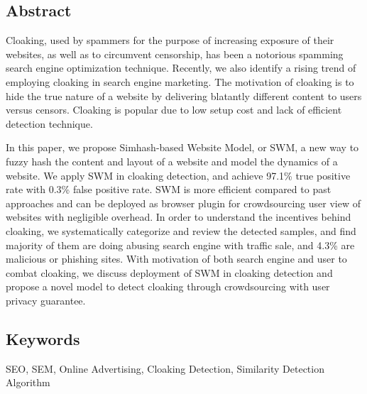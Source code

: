 
\subsection*{Abstract}
Cloaking, used by spammers for the purpose of increasing exposure of
their websites, as well as to circumvent censorship, has been a notorious 
spamming search engine optimization technique. Recently, we also
identify a rising trend of employing cloaking in search engine marketing. The motivation of cloaking 
is to hide the true nature of a website by delivering blatantly different 
content to users versus censors. Cloaking is popular due to low setup cost 
and lack of efficient detection technique. 

In this paper, we propose Simhash-based Website Model, or SWM, a new way to
fuzzy hash the content and layout of a
website and model the dynamics of a website. 
We apply SWM in cloaking detection, and achieve 97.1\% true positive rate with
0.3\% false positive rate. 
SWM is more efficient compared to past approaches and can be deployed as browser
plugin for crowdsourcing user view of websites with negligible overhead.
In order to understand the incentives
behind cloaking, we systematically
categorize and review the detected samples, and find majority of them are
doing abusing search engine with traffic sale, and 4.3\% are 
malicious or phishing sites.
With motivation of both search engine and user to combat cloaking, we discuss
deployment of SWM in cloaking detection and
propose a novel model to
detect cloaking through crowdsourcing with user privacy guarantee.

\subsection*{Keywords}
SEO, SEM, Online Advertising, Cloaking Detection, Similarity Detection
Algorithm
